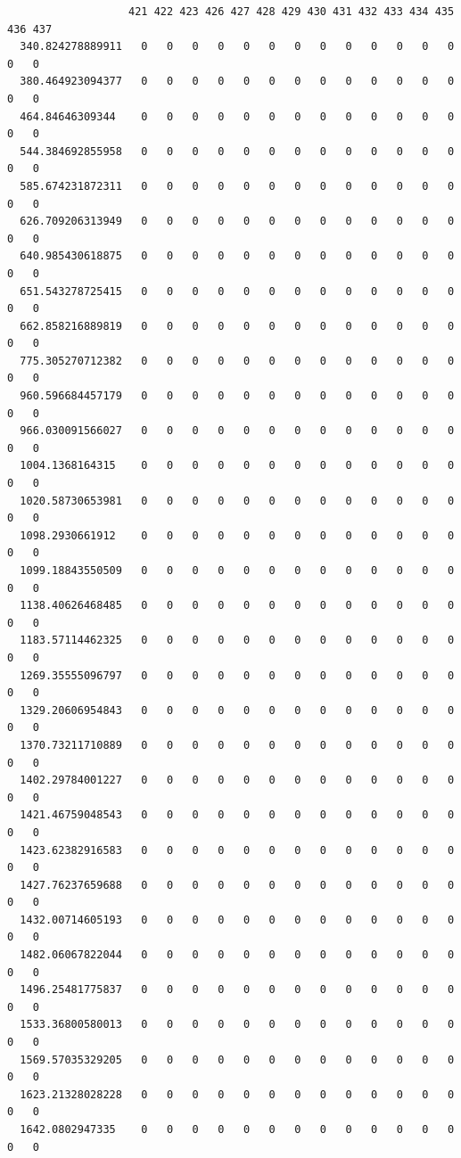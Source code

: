 \documentclass[
  letterpaper,
  DIV=11,
  numbers=noendperiod]{scrartcl}
\begin{document}
\begin{verbatim}
                   421 422 423 426 427 428 429 430 431 432 433 434 435 436 437
  340.824278889911   0   0   0   0   0   0   0   0   0   0   0   0   0   0   0
  380.464923094377   0   0   0   0   0   0   0   0   0   0   0   0   0   0   0
  464.84646309344    0   0   0   0   0   0   0   0   0   0   0   0   0   0   0
  544.384692855958   0   0   0   0   0   0   0   0   0   0   0   0   0   0   0
  585.674231872311   0   0   0   0   0   0   0   0   0   0   0   0   0   0   0
  626.709206313949   0   0   0   0   0   0   0   0   0   0   0   0   0   0   0
  640.985430618875   0   0   0   0   0   0   0   0   0   0   0   0   0   0   0
  651.543278725415   0   0   0   0   0   0   0   0   0   0   0   0   0   0   0
  662.858216889819   0   0   0   0   0   0   0   0   0   0   0   0   0   0   0
  775.305270712382   0   0   0   0   0   0   0   0   0   0   0   0   0   0   0
  960.596684457179   0   0   0   0   0   0   0   0   0   0   0   0   0   0   0
  966.030091566027   0   0   0   0   0   0   0   0   0   0   0   0   0   0   0
  1004.1368164315    0   0   0   0   0   0   0   0   0   0   0   0   0   0   0
  1020.58730653981   0   0   0   0   0   0   0   0   0   0   0   0   0   0   0
  1098.2930661912    0   0   0   0   0   0   0   0   0   0   0   0   0   0   0
  1099.18843550509   0   0   0   0   0   0   0   0   0   0   0   0   0   0   0
  1138.40626468485   0   0   0   0   0   0   0   0   0   0   0   0   0   0   0
  1183.57114462325   0   0   0   0   0   0   0   0   0   0   0   0   0   0   0
  1269.35555096797   0   0   0   0   0   0   0   0   0   0   0   0   0   0   0
  1329.20606954843   0   0   0   0   0   0   0   0   0   0   0   0   0   0   0
  1370.73211710889   0   0   0   0   0   0   0   0   0   0   0   0   0   0   0
  1402.29784001227   0   0   0   0   0   0   0   0   0   0   0   0   0   0   0
  1421.46759048543   0   0   0   0   0   0   0   0   0   0   0   0   0   0   0
  1423.62382916583   0   0   0   0   0   0   0   0   0   0   0   0   0   0   0
  1427.76237659688   0   0   0   0   0   0   0   0   0   0   0   0   0   0   0
  1432.00714605193   0   0   0   0   0   0   0   0   0   0   0   0   0   0   0
  1482.06067822044   0   0   0   0   0   0   0   0   0   0   0   0   0   0   0
  1496.25481775837   0   0   0   0   0   0   0   0   0   0   0   0   0   0   0
  1533.36800580013   0   0   0   0   0   0   0   0   0   0   0   0   0   0   0
  1569.57035329205   0   0   0   0   0   0   0   0   0   0   0   0   0   0   0
  1623.21328028228   0   0   0   0   0   0   0   0   0   0   0   0   0   0   0
  1642.0802947335    0   0   0   0   0   0   0   0   0   0   0   0   0   0   0

\end{verbatim}
\end{document}
